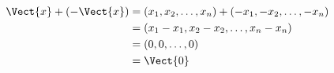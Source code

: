 \documentclass{book}
\begin{document}
$$\begin{aligned}
 \Vect{x}+(-\Vect{x})&=(x_1,x_2,\dots,x_n)+(-x_1,-x_2,\dots,-x_n)\\
  &=(x_1-x_1, x_2-x_2, \dots, x_n-x_n)\\
  &=(0, 0, \dots, 0)\\
  &=\Vect{0}
\end{aligned}$$
\end{document}
